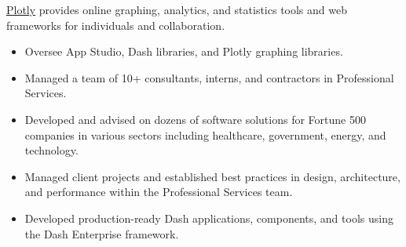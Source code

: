 \documentclass[10pt,ragged2e]{altacv}
\begin{document}
\tagline{}

\begin{fullwidth}
\makecvheader
\end{fullwidth}


\href{https://plotly.com}{Plotly} provides online graphing, analytics, and statistics tools and web frameworks for individuals and collaboration.
\\[8pt]

\begin{itemize}
\item Oversee App Studio, Dash libraries, and Plotly graphing libraries.
\end{itemize}

\divider

\begin{itemize}
\item Managed a team of 10+ consultants, interns, and contractors in Professional Services.
\item Developed and advised on dozens of software solutions for Fortune 500 companies in various sectors including healthcare, government, energy, and technology.
\end{itemize}

\divider

\begin{itemize}
\item Managed client projects and established best practices in design, architecture, and performance within the Professional Services team.
\item Developed production-ready Dash applications, components, and tools using the Dash Enterprise framework.
\end{itemize}
\end{document}
